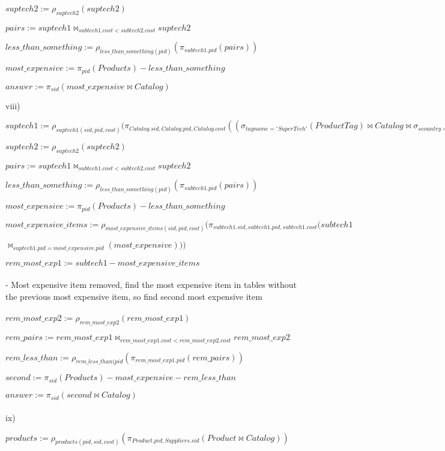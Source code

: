\documentclass[11pt]{article}
\begin{document}
$suptech2 := \rho_{suptech2}(suptech2)$

$pairs := suptech1 \bowtie_{subtech1.cost < subtech2.cost} suptech2$

$less\_than\_something := \rho_{less\_than\_something(pid)}(\pi_{subtech1.pid}(pairs))$

$most\_expensive := \pi_{pid}(Products) - less\_than\_something$

$answer := \pi_{sid}(most\_expensive \bowtie Catalog)$

\break

viii)

$suptech1 := \rho_{suptech1(sid, pid, cost)}(\pi_{Catalog.sid, Catalog.pid, Catalog.cost}((\sigma_{tagname = 'Super Tech'}(ProductTag) \bowtie Catalog \bowtie \sigma_{scountry = 'USA'}(Suppliers)))$

$suptech2 := \rho_{suptech2}(suptech2)$

$pairs := suptech1 \bowtie_{subtech1.cost < subtech2.cost} suptech2$

$less\_than\_something := \rho_{less\_than\_something(pid)}(\pi_{subtech1.pid}(pairs))$

$most\_expensive := \pi_{pid}(Products) - less\_than\_something$

$most\_expensive\_items := \rho_{most\_expensive\_items(sid, pid, cost)}(\pi_{subtech1.sid, subtech1.pid, subtech1.cost}(subtech1 $

$\bowtie_{suptech1.pid = most\_expensive.pid}(most\_expensive)))$

$rem\_most\_exp1 := subtech1 - most\_expensive\_items$
\\~\\
- Most expensive item removed, find the most expensive item in tables without the previous most expensive item, so find second most expensive item
\\~\\
$rem\_most\_exp2 := \rho_{rem\_most\_exp2}(rem\_most\_exp1)$

$rem\_pairs := rem\_most\_exp1 \bowtie_{rem\_most\_exp1.cost < rem\_most\_exp2.cost} rem\_most\_exp2$

$rem\_less\_than := \rho_{rem\_less\_than(pid}(\pi_{rem\_most\_exp1.pid}(rem\_pairs))$

$second := \pi_{sid}(Products) - most\_expensive - rem\_less\_than$

$answer := \pi_{sid}(second \bowtie Catalog)$
\\~\\
ix)

$products := \rho_{products(pid, sid, cost)}(\pi_{Product.pid, Suppliers.sid}(Product \bowtie Catalog))$
\end{document}
